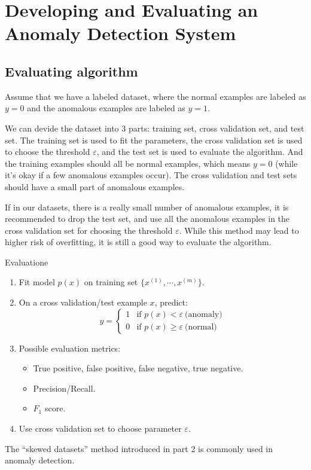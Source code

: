 \section{Developing and Evaluating an Anomaly Detection System}
\subsection*{Evaluating algorithm}
Assume that we have a labeled dataset, 
where the normal examples are labeled as $y=0$ and the anomalous examples are labeled as $y=1.$
\par
We can devide the dataset into 3 parts: training set, cross validation set, and test set.
The training set is used to fit the parameters, the cross validation set is used to choose the threshold $\varepsilon$,
and the test set is used to evaluate the algorithm.
And the training examples should all be normal examples, which means $y=0$ (while it's okay if a few 
anomalous examples occur). The cross validation and test sets should have a small part of anomalous examples.
\par
If in our datasets, there is a really small number of anomalous examples, it is
recommended to drop the test set, and use all the anomalous examples in the cross validation set for choosing the threshold $\varepsilon$.
While this method may lead to higher risk of overfitting, it is still a good way to evaluate the algorithm.
\par
\begin{thmbox}{Evaluation}{e}
    \begin{enumerate}
        \item Fit model $p(x)$ on training set $\{x^{(1)},\cdots,x^{(m)}\}$.
        \item On a cross validation/test example $x$, predict:
        \begin{equation}
            y = \begin{cases}
                1 & \text{if } p(x) < \varepsilon \ \text{(anomaly)}\\
                0 & \text{if } p(x) \geq \varepsilon \ \text{(normal)}
            \end{cases}
        \end{equation}
        \item Possible evaluation metrics:
        \begin{itemize}
            \item True positive, false positive, false negative, true negative.
            \item Precision/Recall.
            \item $F_1$ score.
        \end{itemize}
        \item Use cross validation set to choose parameter $\varepsilon$.
    \end{enumerate}
    \begin{notebox}
        The ``skewed datasets'' method introduced in part 2 is commonly used in anomaly detection.
    \end{notebox}
\end{thmbox}

